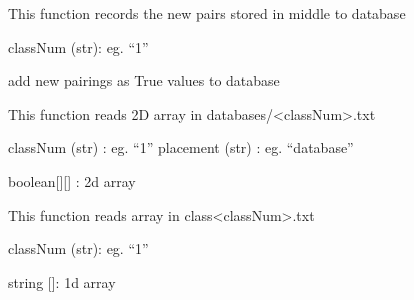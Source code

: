 \documentclass[letterpaper,10pt,english]{sphinxmanual}
\begin{document}
\sphinxstepscope
{}\label{\detokenize{GUI:module-GUI}}

\begin{fulllineitems}
\label{\detokenize{GUI:GUI.MiddleToDatabase}}
\pysigstartsignatures
{}
\pysigstopsignatures
\sphinxAtStartPar
This function records the new pairs stored in middle to database
\begin{description}
\sphinxAtStartPar
classNum (str): eg. “1”

\sphinxAtStartPar
add new pairings as True values to database

\end{description}

\end{fulllineitems}


\begin{fulllineitems}
\label{\detokenize{GUI:GUI.getTable}}
\pysigstartsignatures
{}
\pysigstopsignatures
\sphinxAtStartPar
This function reads 2D array in databases/\textless{}classNum\textgreater{}.txt
\begin{description}
\sphinxAtStartPar
classNum (str) : eg. “1”
placement (str) : eg. “database”

\sphinxAtStartPar
boolean{[}{]}{[}{]} : 2d array

\end{description}

\end{fulllineitems}


\begin{fulllineitems}
\label{\detokenize{GUI:GUI.readStudentName}}
\pysigstartsignatures
{}
\pysigstopsignatures
\sphinxAtStartPar
This function reads array in class\textless{}classNum\textgreater{}.txt
\begin{description}
\sphinxAtStartPar
classNum (str): eg. “1”

\sphinxAtStartPar
string {[}{]}: 1d array

\end{description}

\end{fulllineitems}
\end{document}
